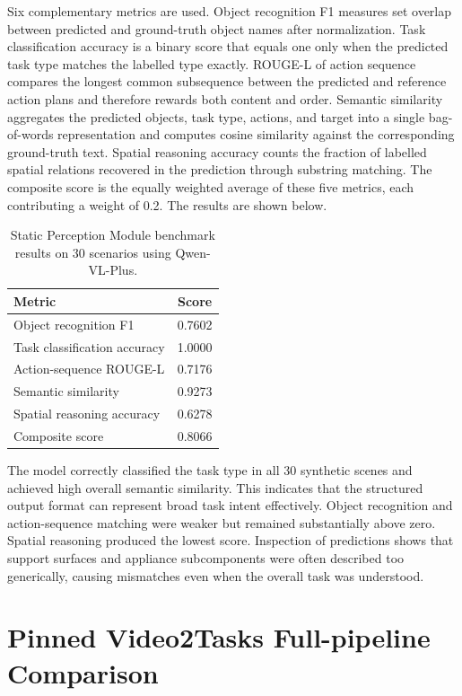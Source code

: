 \documentclass[11pt,oneside]{report}
\begin{document}
Six complementary metrics are used. Object recognition F1 measures set overlap between predicted and ground-truth object names after normalization. Task classification accuracy is a binary score that equals one only when the predicted task type matches the labelled type exactly. ROUGE-L of action sequence compares the longest common subsequence between the predicted and reference action plans and therefore rewards both content and order. Semantic similarity aggregates the predicted objects, task type, actions, and target into a single bag-of-words representation and computes cosine similarity against the corresponding ground-truth text. Spatial reasoning accuracy counts the fraction of labelled spatial relations recovered in the prediction through substring matching. The composite score is the equally weighted average of these five metrics, each contributing a weight of 0.2. The results are shown below.
\begin{table}[htbp]
  \centering
  \label{tab:static-vlo-metrics}
  \begin{tabular}{lc}
    \hline
    Metric & Score \\
    \hline
    Object recognition F1 & 0.7602 \\
    Task classification accuracy & 1.0000 \\
    Action-sequence ROUGE-L & 0.7176 \\
    Semantic similarity & 0.9273 \\
    Spatial reasoning accuracy & 0.6278 \\
    Composite score & 0.8066 \\
    \hline
  \end{tabular}
  \caption{Static Perception Module benchmark results on 30 scenarios using Qwen-VL-Plus.}
\end{table}

The model correctly classified the task type in all 30 synthetic scenes and achieved high overall semantic similarity. This indicates that the structured output format can represent broad task intent effectively. Object recognition and action-sequence matching were weaker but remained substantially above zero. Spatial reasoning produced the lowest score. Inspection of predictions shows that support surfaces and appliance subcomponents were often described too generically, causing mismatches even when the overall task was understood.

\section{Pinned Video2Tasks Full-pipeline Comparison}
\end{document}
